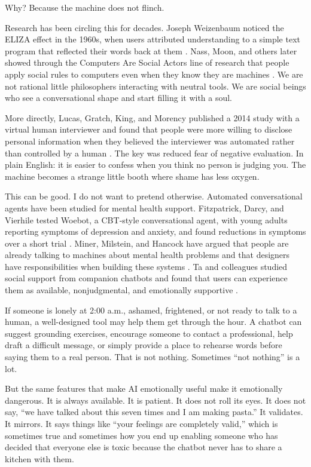 \documentclass[12pt,oneside]{book}
\begin{document}
Why? Because the machine does not flinch.

Research has been circling this for decades. Joseph Weizenbaum noticed the ELIZA effect in the 1960s, when users attributed understanding to a simple text program that reflected their words back at them \parencite{weizenbaum1966}. Nass, Moon, and others later showed through the Computers Are Social Actors line of research that people apply social rules to computers even when they know they are machines \parencite{nass1994,nass2000}. We are not rational little philosophers interacting with neutral tools. We are social beings who see a conversational shape and start filling it with a soul.

More directly, Lucas, Gratch, King, and Morency published a 2014 study with a virtual human interviewer and found that people were more willing to disclose personal information when they believed the interviewer was automated rather than controlled by a human \parencite{lucas2014}. The key was reduced fear of negative evaluation. In plain English: it is easier to confess when you think no person is judging you. The machine becomes a strange little booth where shame has less oxygen.

This can be good. I do not want to pretend otherwise. Automated conversational agents have been studied for mental health support. Fitzpatrick, Darcy, and Vierhile tested Woebot, a CBT-style conversational agent, with young adults reporting symptoms of depression and anxiety, and found reductions in symptoms over a short trial \parencite{fitzpatrick2017}. Miner, Milstein, and Hancock have argued that people are already talking to machines about mental health problems and that designers have responsibilities when building these systems \parencite{miner2017}. Ta and colleagues studied social support from companion chatbots and found that users can experience them as available, nonjudgmental, and emotionally supportive \parencite{ta2020}.

If someone is lonely at 2:00 a.m., ashamed, frightened, or not ready to talk to a human, a well-designed tool may help them get through the hour. A chatbot can suggest grounding exercises, encourage someone to contact a professional, help draft a difficult message, or simply provide a place to rehearse words before saying them to a real person. That is not nothing. Sometimes ``not nothing'' is a lot.

But the same features that make AI emotionally useful make it emotionally dangerous. It is always available. It is patient. It does not roll its eyes. It does not say, ``we have talked about this seven times and I am making pasta.'' It validates. It mirrors. It says things like ``your feelings are completely valid,'' which is sometimes true and sometimes how you end up enabling someone who has decided that everyone else is toxic because the chatbot never has to share a kitchen with them.
\end{document}
